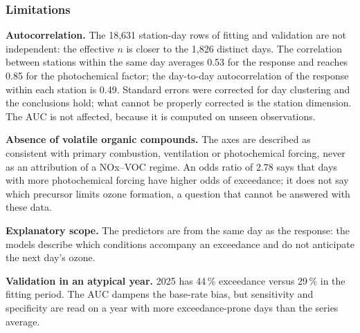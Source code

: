 \subsubsection{Limitations}\label{sec:limitaciones-clasificacion}

\textbf{Autocorrelation.} The 18,631 station-day rows of fitting and
validation are not independent: the effective $n$ is closer to the 1,826
distinct days. The correlation between stations within the same day averages
0.53 for the response and reaches 0.85 for the photochemical factor; the
day-to-day autocorrelation of the response within each station is 0.49.
Standard errors were corrected for day clustering and the conclusions hold;
what cannot be properly corrected is the station dimension. The AUC is not
affected, because it is computed on unseen observations.

\textbf{Absence of volatile organic compounds.} The axes are described as
consistent with primary combustion, ventilation or photochemical forcing,
never as an attribution of a NOx--VOC regime. An odds ratio of 2.78 says that
days with more photochemical forcing have higher odds of exceedance; it does
not say which precursor limits ozone formation, a question that cannot be
answered with these data.

\textbf{Explanatory scope.} The predictors are from the same day as the
response: the models describe which conditions accompany an exceedance and
do not anticipate the next day's ozone.

\textbf{Validation in an atypical year.} 2025 has 44\,\% exceedance versus
29\,\% in the fitting period. The AUC dampens the base-rate bias, but
sensitivity and specificity are read on a year with more exceedance-prone
days than the series average.
